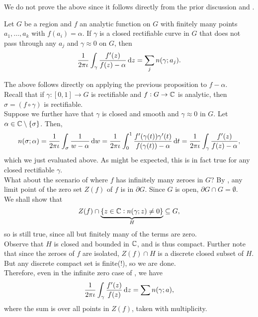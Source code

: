 		We do not prove the above since it follows directly from the prior discussion and .

		\begin{corollary}
			\label{cor 2.38}
			Let $G$ be a region and $f$ an analytic function on $G$ with finitely many points $a_1,\ldots,a_k$ with $f(a_i) = \alpha$. If $\gamma$ is a closed rectifiable curve in $G$ that does not pass through any $a_j$ and $\gamma \approx 0$ on $G$, then
			\[ \frac{1}{2\pi\iota} \int_\gamma \frac{f'(z)}{f(z)-\alpha} \dif z = \sum_j n(\gamma;a_j). \]
		\end{corollary}

		The above follows directly on applying the previous proposition to $f-\alpha$.\\

		Recall that if $\gamma:[0,1] \to G$ is rectifiable and $f:G\to\mathbb{C}$ is analytic, then $\sigma = (f\circ\gamma)$ is rectifiable. \\
		Suppose we further have that $\gamma$ is closed and smooth and $\gamma \approx 0$ in $G$. Let $\alpha \in \mathbb{C} \setminus \{\sigma\}$. Then,
		\[ n(\sigma;\alpha) = \frac{1}{2\pi\iota} \int_\sigma \frac{1}{w-\alpha} \dif w = \frac{1}{2\pi\iota} \int_0^1 \frac{f'(\gamma(t))\gamma'(t)}{f(\gamma(t)) - \alpha} \dif t = \frac{1}{2\pi\iota} \int_\gamma \frac{f'(z)}{f(z)-\alpha}, \]
		which we just evaluated above. As might be expected, this is in fact true for any closed rectifiable $\gamma$.\\

		What about the scenario of  where $f$ has infinitely many zeroes in $G$? By , any limit point of the zero set $Z(f)$ of $f$ is in $\partial G$. Since $G$ is open, $\partial G \cap G = \emptyset$. \\
		We shall show that
		\[ Z(f) \cap \underbrace{\{ z \in \mathbb{C} : n(\gamma;z) \ne 0 \}}_{H} \subseteq G, \]
		so  is still true, since all but finitely many of the terms are zero.\\
		Observe that $H$ is closed and bounded in $\mathbb{C}$, and is thus compact. Further note that since the zeroes of $f$ are isolated, $Z(f) \cap H$ is a discrete closed subset of $H$. But any discrete compact set is finite(!), so we are done.\\
		Therefore, even in the infinite zero case of , we have
		\[ \frac{1}{2\pi\iota} \int_\gamma \frac{f'(z)}{f(z)} \dif z = \sum n(\gamma;a), \]
		where the sum is over all points in $Z(f)$, taken with multiplicity.


